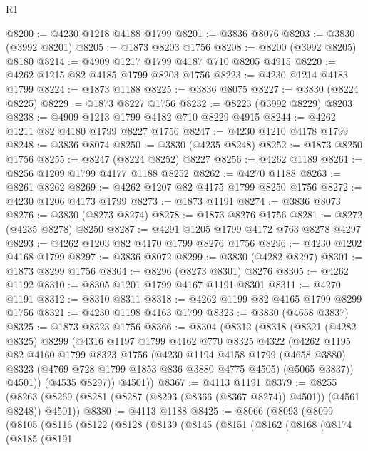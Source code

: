 \begin{lexlean}{R1}
\begin{coremodule}
@8200 := @4230 @1218 @4188 @1799
@8201 := @3836 @8076
@8203 := @3830 (@3992 @8201)
@8205 := @1873 @8203 @1756
@8208 := @8200 (@3992 @8205) @8180
@8214 := @4909 @1217 @1799 @4187 @710 @8205 @4915
@8220 := @4262 @1215 @82 @4185 @1799 @8203 @1756
@8223 := @4230 @1214 @4183 @1799
@8224 := @1873 @1188
@8225 := @3836 @8075
@8227 := @3830 (@8224 @8225)
@8229 := @1873 @8227 @1756
@8232 := @8223 (@3992 @8229) @8203
@8238 := @4909 @1213 @1799 @4182 @710 @8229 @4915
@8244 := @4262 @1211 @82 @4180 @1799 @8227 @1756
@8247 := @4230 @1210 @4178 @1799
@8248 := @3836 @8074
@8250 := @3830 (@4235 @8248)
@8252 := @1873 @8250 @1756
@8255 := @8247 (@8224 @8252) @8227
@8256 := @4262 @1189
@8261 := @8256 @1209 @1799 @4177 @1188 @8252
@8262 := @4270 @1188
@8263 := @8261 @8262
@8269 := @4262 @1207 @82 @4175 @1799 @8250 @1756
@8272 := @4230 @1206 @4173 @1799
@8273 := @1873 @1191
@8274 := @3836 @8073
@8276 := @3830 (@8273 @8274)
@8278 := @1873 @8276 @1756
@8281 := @8272 (@4235 @8278) @8250
@8287 := @4291 @1205 @1799 @4172 @763 @8278 @4297
@8293 := @4262 @1203 @82 @4170 @1799 @8276 @1756
@8296 := @4230 @1202 @4168 @1799
@8297 := @3836 @8072
@8299 := @3830 (@4282 @8297)
@8301 := @1873 @8299 @1756
@8304 := @8296 (@8273 @8301) @8276
@8305 := @4262 @1192
@8310 := @8305 @1201 @1799 @4167 @1191 @8301
@8311 := @4270 @1191
@8312 := @8310 @8311
@8318 := @4262 @1199 @82 @4165 @1799 @8299 @1756
@8321 := @4230 @1198 @4163 @1799
@8323 := @3830 (@4658 @3837)
@8325 := @1873 @8323 @1756
@8366 := @8304
    (@8312
      (@8318
        (@8321
          (@4282 @8325)
          @8299
          (@4316
            @1197
            @1799
            @4162
            @770
            @8325
            @4322
            (@4262
              @1195
              @82
              @4160
              @1799
              @8323
              @1756
              (@4230
                @1194
                @4158
                @1799
                (@4658 @3880)
                @8323
                (@4769 @728 @1799 @1853 @836 @3880 @4775 @4505)
                (@5065 @3837))
              @4501))
          (@4535 @8297))
        @4501))
@8367 := @4113 @1191
@8379 := @8255
    (@8263 (@8269 (@8281 (@8287 (@8293 (@8366 (@8367 @8274)) @4501)) (@4561 @8248)) @4501))
@8380 := @4113 @1188
@8425 := @8066
    (@8093
      (@8099
        (@8105
          (@8116
            (@8122
              (@8128
                (@8139
                  (@8145
                    (@8151
                      (@8162
                        (@8168
                          (@8174
                            (@8185
                              (@8191

\end{coremodule}
\end{lexlean}
